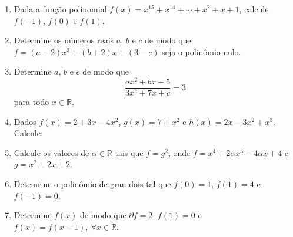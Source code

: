 \documentclass[a4paper,5pt]{amsbook}
\newcommand{\ds}{\displaystyle}
\begin{document}
\vspace{1cm}
\begin{enumerate}
	\vspace{0.5cm}
	\item Dada a fun\c{c}\~ao polinomial $f(x) = x^{15} + x^{14} + \cdots + x^2 + x +
		1$, calcule $f(-1)$, $f(0)$ e $f(1)$.

	\vspace{0.5cm}
	\item Determine os n\'umeros reais $a$, $b$ e $c$ de modo que $f = (a-2)x^3 +
		(b+2)x + (3-c)$ seja o polin\^omio nulo.

	\vspace{0.5cm}
	\item Determine $a$, $b$ e $c$ de modo que
		\[\ds\frac{ax^2+bx-5}{3x^2+7x+c} = 3\]
		para todo $x\in\mathbb{R}$.

	\vspace{0.5cm}
	\item Dados $f(x) = 2+3x-4x^2$, $g(x) = 7+x^2$ e $h(x) = 2x-3x^2+x^3$. Calcule:

		\vspace{0.3cm}

	\vspace{0.5cm}
	\item Calcule os valores de $\alpha\in\mathbb{R}$ tais que $f=g^2$, onde $f
		= x^4+2\alpha x^3-4\alpha x+4$ e $g = x^2+2x+2$.

	\vspace{0.5cm}
	\item Detemrine o polin\^omio de grau dois tal que $f(0)=1$, $f(1)=4$ e
		$f(-1)=0$.

	\vspace{0.5cm}
	\item Determine $f(x)$ de modo que $\partial f=2$, $f(1)=0$ e
		$f(x)=f(x-1),\ \forall x\in\mathbb{R}$.
\end{enumerate}
\end{document}
